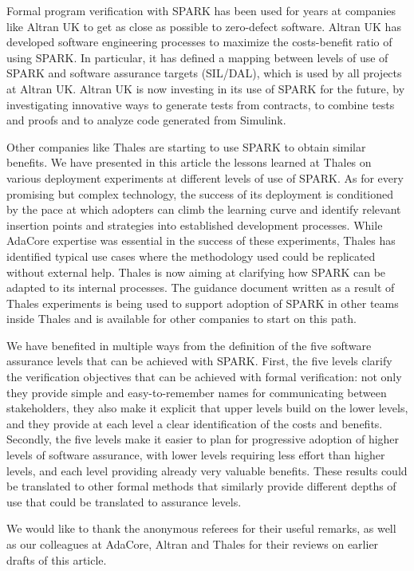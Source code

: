 \documentclass{eceasst}
\begin{document}
Formal program verification with SPARK has been used for years at companies
like Altran UK to get as close as possible to zero-defect software. Altran UK
has developed software engineering processes to maximize the costs-benefit
ratio of using SPARK. In particular, it has defined a mapping between levels of
use of SPARK and software assurance targets (SIL/DAL), which is used by all
projects at Altran UK. Altran UK is now investing in its use of SPARK for the
future, by investigating innovative ways to generate tests from contracts, to
combine tests and proofs and to analyze code generated from Simulink.

Other companies like Thales are starting to use SPARK to obtain similar
benefits. We have presented in this article the lessons learned at Thales on
various deployment experiments at different levels of use of SPARK. As for
every promising but complex technology, the success of its deployment is
conditioned by the pace at which adopters can climb the learning curve and
identify relevant insertion points and strategies into established development
processes. While AdaCore expertise was essential in the success of these
experiments, Thales has identified typical use cases where the methodology used
could be replicated without external help. Thales is now aiming at clarifying
how SPARK can be adapted to its internal processes. The guidance document
written as a result of Thales experiments is being used to support adoption of
SPARK in other teams inside Thales and is available for other companies to
start on this path.

We have benefited in multiple ways from the definition of the five software
assurance levels that can be achieved with SPARK. First, the five levels
clarify the verification objectives that can be achieved with formal
verification: not only they provide simple and easy-to-remember names for
communicating between stakeholders, they also make it explicit that upper
levels build on the lower levels, and they provide at each level a clear
identification of the costs and benefits. Secondly, the five levels make it
easier to plan for progressive adoption of higher levels of software assurance,
with lower levels requiring less effort than higher levels, and each level
providing already very valuable benefits. These results could be translated to
other formal methods that similarly provide different depths of use that could
be translated to assurance levels.


\begin{acknowledge}
We would like to thank the anonymous referees for their useful remarks, as well
as our colleagues at AdaCore, Altran and Thales for their reviews on earlier
drafts of this article.
\end{acknowledge}
\end{document}
